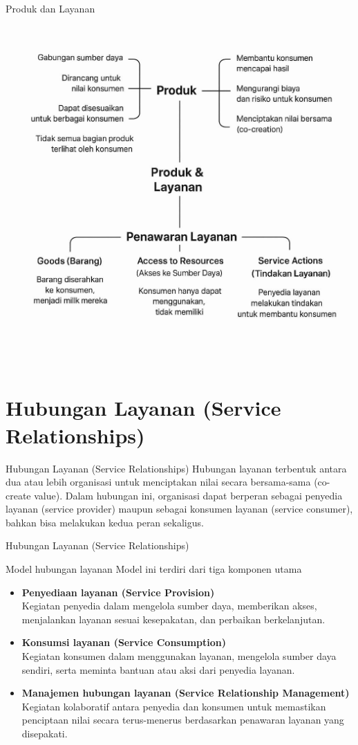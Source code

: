 \documentclass[aspectratio=179]{beamer}
\begin{document}
\begin{frame}{Produk dan Layanan}
\centering
    \includegraphics[width=0.5\linewidth]{Produk.jpg} %
\end{frame}

\section{Hubungan Layanan (Service Relationships)}
\begin{frame}{Hubungan Layanan (Service Relationships)}
    Hubungan layanan terbentuk antara dua atau lebih organisasi untuk menciptakan nilai secara bersama-sama (co-create value). Dalam hubungan ini, organisasi dapat berperan sebagai penyedia layanan (service provider) maupun sebagai konsumen layanan (service consumer), bahkan bisa melakukan kedua peran sekaligus.
\end{frame}

\begin{frame}{Hubungan Layanan (Service Relationships)}
    \begin{block}{Model hubungan layanan}
    {Model ini terdiri dari tiga komponen utama}
        \begin{itemize}
            \item \textbf{Penyediaan layanan (Service Provision)}\\
            Kegiatan penyedia dalam mengelola sumber daya, memberikan akses, menjalankan layanan sesuai kesepakatan, dan perbaikan berkelanjutan.
            \item \textbf{Konsumsi layanan (Service Consumption)}\\
            Kegiatan konsumen dalam menggunakan layanan, mengelola sumber daya sendiri, serta meminta bantuan atau aksi dari penyedia layanan.
            \item \textbf{Manajemen hubungan layanan (Service Relationship Management)}\\
            Kegiatan kolaboratif antara penyedia dan konsumen untuk memastikan penciptaan nilai secara terus-menerus berdasarkan penawaran layanan yang disepakati.
        \end{itemize}
    \end{block}
\end{frame}
\end{document}
